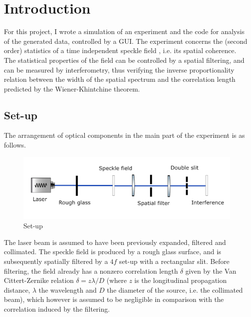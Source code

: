 \section{Introduction}

For this project, I wrote a simulation of an experiment and the code for analysis of the generated data, controlled by a GUI. The experiment concerns the (second order) 
statistics of a time independent speckle field , i.e. its spatial coherence. The statistical properties of the field can be controlled by a spatial filtering, 
and can be measured by interferometry, thus verifying the inverse proportionality relation between the width of the spatial spectrum and the correlation 
length predicted by the Wiener-Khintchine theorem. \\


\subsection{Set-up}

The arrangement of optical components in the main part of the experiment is as follows.

\begin{figure}[!ht]
    \centering
    \includegraphics[width = .9\textwidth]{Img/setup.png}
    \caption{Set-up}
\end{figure}

The laser beam is assumed to have been previously expanded, filtered and collimated. The speckle field is produced by a rough glass surface, and is subsequently 
spatially filtered by a $4f$ set-up with a rectangular slit. Before filtering, the field already has a nonzero correlation length $\delta$ given by the Van Cittert-Zernike 
relation $\delta = z\lambda / D$ (where $z$ is the longitudinal propagation distance, $\lambda$ the wavelength and $D$ the diameter of the source, i.e. the collimated 
beam), which however is assumed to be negligible in comparison with the correlation induced by the filtering. \\

